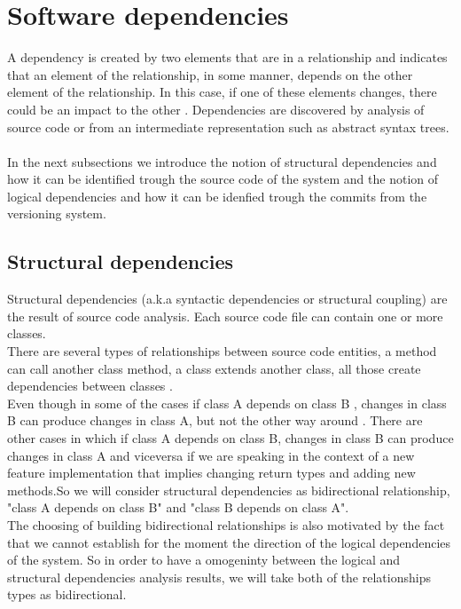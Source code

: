 \documentclass[conference,compsoc]{IEEEtran}
\begin{document}
\section{Software dependencies}
 A dependency is created by two elements that are in a relationship and indicates that an element of the relationship, in some manner, depends on the other element of the relationship. In this case, if one of these elements changes, there could be an impact to the other \cite{ct2}. Dependencies are discovered by analysis of source code or from an intermediate representation such as abstract syntax trees.\cite{ct3}\\ \\ In the next subsections we introduce the notion of structural dependencies and how it can be identified trough the source code of the system and the notion of logical dependencies and how it can be idenfied trough the commits from the versioning system.

\subsection{ Structural dependencies}
Structural dependencies (a.k.a syntactic dependencies or structural coupling) are the result of source code analysis. Each source code file can contain one or more classes. \\There are several types of relationships between source code entities, a method can call another class method, a class extends another class, all those create dependencies between classes \cite{ct4}.\\ Even though in some of the cases if class A depends on class B , changes in class B can produce changes in class A, but not the other way around \cite{ct5} . There are other cases in which if class A depends on class B,  changes in class B can produce changes in class A and viceversa if we are speaking in the context of a new feature implementation that implies changing return types and adding new methods.So we will consider structural dependencies as bidirectional relationship, "class A depends on class B" and "class B depends on class A". \\The choosing of building bidirectional relationships is also motivated by the fact that we cannot establish for the moment the direction of the logical dependencies of the system. So in order to have a omogeninty between the logical and structural dependencies analysis results, we will take both of the relationships types as bidirectional. 
\end{document}
